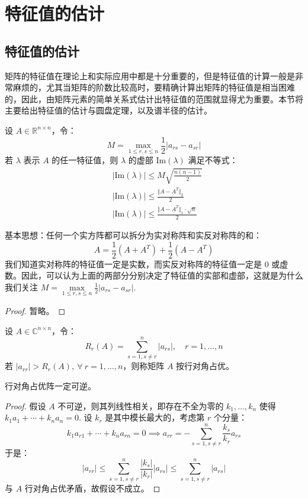 \section{特征值的估计}

\subsection{特征值的估计}

矩阵的特征值在理论上和实际应用中都是十分重要的，但是特征值的计算一般是非常麻烦的，尤其当矩阵的阶数比较高时，要精确计算出矩阵的特征值是相当困难的，因此，由矩阵元素的简单关系式估计出特征值的范围就显得尤为重要。本节将主要给出特征值的估计与圆盘定理，以及谱半径的估计。

\begin{theorem}[特征值的上界]
设 $A\in \mathbb R^{n\times n}$，令：
\[
    M=\max_{1\leq r,s\leq n}\frac{1}{2}|a_{rs}-a_{sr}|
\]
若 $\lambda$ 表示 $A$ 的任一特征值，则 $\lambda$ 的虚部 $\text{Im}(\lambda)$ 满足不等式：
\begin{align*}
    &|\text{Im}(\lambda)|\leq M\sqrt{\frac{n(n-1)}{2}}\\
    &|\text{Im}(\lambda)|\leq\frac{\Vert A-A^T\Vert_2}{2}\\
    &|\text{Im}(\lambda)|\leq\frac{\Vert A-A^T\Vert_1\cdot\sqrt{n}}{2}
\end{align*}
\end{theorem}

\begin{remark}
基本思想：任何一个实方阵都可以拆分为实对称阵和实反对称阵的和：
\[
    A=\frac{1}{2}(A+A^T)+\frac{1}{2}(A-A^T)
\]
我们知道实对称阵的特征值一定是实数，而实反对称阵的特征值一定是 0 或虚数。因此，可以认为上面的两部分分别决定了特征值的实部和虚部，这就是为什么我们关注 $M=\max\limits_{1\leq r,s\leq n}\frac{1}{2}|a_{rs}-a_{sr}|$.
\end{remark}
\begin{proof}
暂略。
\end{proof}

\begin{definition}[行对角占优]
设 $A\in\mathbb C^{n\times n}$，令：
\[
    R_r(A)=\sum_{s=1,s\neq r}^n|a_{rs}|,\quad r=1,\ldots,n
\]
若 $|a_{rr}|>R_{r}(A),\ \forall\ r=1,\ldots,n$，则称矩阵 $A$ 按行对角占优。
\end{definition}

\begin{theorem}
行对角占优阵一定可逆。
\end{theorem}
\begin{proof}
假设 $A$ 不可逆，则其列线性相关，即存在不全为零的 $k_1,\ldots,k_n$ 使得 $k_1a_1+\cdots+k_na_n=0$. 设 $k_r$ 是其中模长最大的，考虑第 $r$ 个分量：
\[
    k_1a_{r1}+\cdots+k_na_{rn}=0\implies a_{rr}=-\sum_{s=1,s\neq r}^n\frac{k_s}{k_r}a_{rs}
\]
于是：
\[
    |a_{rr}|\leq \sum_{s=1,s\neq r}^n\frac{|k_s|}{|k_r|}|a_{rs}|\leq \sum_{s=1,s\neq r}^n|a_{rs}|
\]
与 $A$ 行对角占优矛盾，故假设不成立。
\end{proof}

